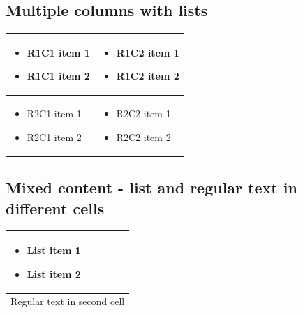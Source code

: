 \documentclass[11pt,a4paper]{article}
\begin{document}
\subsection{Multiple columns with lists}

\begin{table}[h]
\begin{tabular}{|l|l|}
\hline
\begin{itemize} \item R1C1 item 1 \item R1C1 item 2 \end{itemize} & \begin{itemize} \item R1C2 item 1 \item R1C2 item 2 \end{itemize} \\ \hline
\begin{itemize} \item R2C1 item 1 \item R2C1 item 2 \end{itemize} & \begin{itemize} \item R2C2 item 1 \item R2C2 item 2 \end{itemize} \\ \hline
\end{tabular}
\end{table}

\subsection{Mixed content - list and regular text in different cells}

\begin{table}[h]
\begin{tabular}{|l|}
\hline
\begin{itemize} \item List item 1 \item List item 2 \end{itemize} \\ \hline
Regular text in second cell \\ \hline
\end{tabular}
\end{table}
\end{document}
